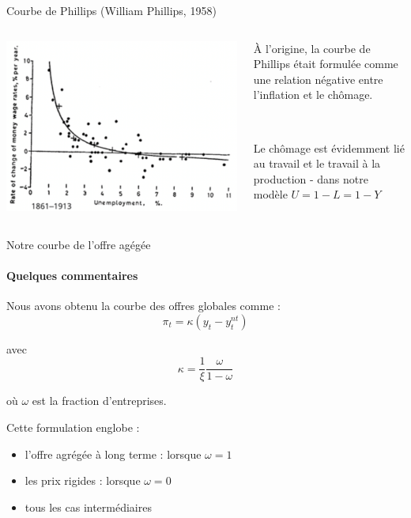 \documentclass[
  ignorenonframetext,
  aspectratio=169,
]{beamer}
\providecommand{\tightlist}{%
  \setlength{\itemsep}{0pt}\setlength{\parskip}{0pt}}\usepackage{longtable,booktabs,array}
\begin{document}
\begin{frame}{Courbe de Phillips (William Phillips, 1958)}
\label{courbe-de-phillips-william-phillips-1958}
\begin{columns}[T]
\begin{column}{0.48\textwidth}
\includegraphics{assets/session_32.png}
\end{column}

\begin{column}{0.48\textwidth}
À l'origine, la courbe de Phillips était formulée comme une relation
négative entre l'inflation et le chômage.

~

Le chômage est évidemment lié au travail et le travail à la production -
dans notre modèle \(U=1-L=1-Y\)
\end{column}
\end{columns}
\end{frame}

\begin{frame}{Notre courbe de l'offre agégée}
\label{notre-courbe-de-loffre-aguxe9guxe9e}
\framesubtitle{Quelques commentaires}

Nous avons obtenu la courbe des offres globales comme :
\[\pi_t = \kappa (y_t- y^{nt}_t)\]

avec \[\kappa = \frac{1}{\xi} \frac{\omega}{1-\omega}\]

où \(\omega\) est la fraction d'entreprises.

Cette formulation englobe :

\begin{itemize}
\tightlist
\item
  l'offre agrégée à long terme : lorsque \(\omega=1\)
\item
  les prix rigides : lorsque \(\omega=0\)
\item
  tous les cas intermédiaires
\end{itemize}
\end{frame}
\end{document}
